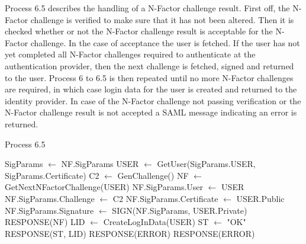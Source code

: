 \documentclass[twosided]{report}
\begin{document}
Process 6.5 describes the handling of a N-Factor challenge result. First off, the N-Factor challenge is verified to make sure that it has not been altered. Then it is checked whether or not the N-Factor challenge result is acceptable for the N-Factor challenge. In the case of acceptance the user is fetched. If the user has not yet completed all N-Factor challenges required to authenticate at the authentication provider, then the next challenge is fetched, signed and returned to the user. Process 6 to 6.5 is then repeated until no more N-Factor challenges are required, in which case login data for the user is created and returned to the identity provider. In case of the N-Factor challenge not passing verification or the N-Factor challenge result is not accepted a SAML message indicating an error is returned.
\begin{algorithm}[H]
	\caption{Process 6.5}
	\begin{algorithmic}
		\STATE SigParams $\leftarrow$ NF.SigParams
				\STATE USER $\leftarrow$ GetUser(SigParams.USER, SigParams.Certificate)
				\STATE C2 $\leftarrow$ GenChallenge()
					\STATE NF $\leftarrow$ GetNextNFactorChallenge(USER)
					\STATE NF.SigParams.User $\leftarrow$ USER
					\STATE NF.SigParams.Challenge $\leftarrow$ C2
					\STATE NF.SigParams.Certificate $\leftarrow$ USER.Public
					\STATE NF.SigParams.Signature $\leftarrow$ SIGN(NF.SigParams, USER.Private)
					\RETURN RESPONSE(NF)
				\ELSE
					\STATE LID $\leftarrow$ CreateLogInData(USER)
					\STATE ST $\leftarrow$ "OK"
					\RETURN RESPONSE(ST, LID)
				\ENDIF
			\ELSE
				\RETURN RESPONSE(ERROR)
			\ENDIF
		\ELSE
			\RETURN RESPONSE(ERROR)
		\ENDIF	
	\end{algorithmic}
\end{algorithm}
\end{document}
